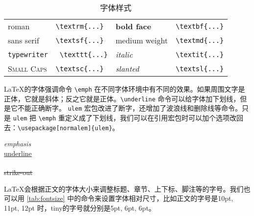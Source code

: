 \begin{table}[htbp]
\centering
\caption{字体样式}
\label{tab:font_style}
\begin{tabular}{llll}
  \toprule
  \textrm{roman} & \verb|\textrm{...}| & 
    \textbf{bold face} & \verb|\textbf{...}| \\
  \textsf{sans serif} & \verb|\textsf{...}| & 
    \textmd{medium weight} & \verb|\textmd{...}| \\
  \texttt{typewriter} & \verb| \texttt{...}| & 
    \textit{italic} & \verb|\textit{...}| \\
  \textsc{Small Caps} & \verb|\textsc{...}| & 
    \textsl{slanted} & \verb|\textsl{...}| \\
  \bottomrule
\end{tabular}
\end{table}

\LaTeX 的字体强调命令 \verb|\emph| 在不同字体环境中有不同的效果。如果周围文字是正体，它就是斜体；反之它就是正体。\verb|\underline| 命令可以给字体加下划线，但是它不能正确断字。 \texttt{ulem} 宏包改进了断字，还增加了波浪线和删除线等命令。只是 \texttt{ulem} 把 \verb|\emph| 重定义成了下划线，我们可以在引用宏包时可以加个选项改回去：\verb|\usepackage[normalem]{ulem}|。

\begin{example}[htbp]
\begin{RLDemo}[]
\emph{emphasis}\\
\uline{underline}\\
\\
\sout{strike-out}
\end{RLDemo}
\caption{字体强调和下划线}
\end{example}

\LaTeX 会根据正文的字体大小来调整标题、章节、上下标、脚注等的字号。我们也可以用 \autoref{tab:fontsize} 中的命令来设置字体相对尺寸，比如正文的字号是10pt, 11pt, 12pt 时，tiny的字号就分别是5pt, 6pt, 6pt。

